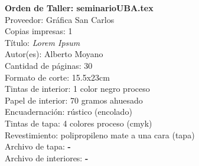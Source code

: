 \documentclass[11pt]{article}
\newcommand\titulo[1]{\sf\Large{\textbf{#1}}}
\newcommand\subtitulo[1]{\sf\large{#1}}
\begin{document}
\thispagestyle{empty}
\noindent \titulo{Orden de Taller: seminarioUBA.tex}\\

\noindent \subtitulo{Proveedor: Gráfica San Carlos}\\
\noindent \subtitulo{Copias impresas: 1}\\

\noindent \subtitulo{Título: \emph{Lorem Ipsum}}\\
\noindent \subtitulo{Autor(es): Alberto Moyano}\\
\noindent \subtitulo{Cantidad de páginas: 30}\\
\noindent \subtitulo{Formato de corte: 15.5x23cm}\\
\noindent \subtitulo{Tintas de interior: 1 color negro proceso}\\
\noindent \subtitulo{Papel de interior: 70 gramos ahuesado}\\
\noindent \subtitulo{Encuadernación: rústico (encolado)}\\
\noindent \subtitulo{Tintas de tapa: 4 colores proceso (cmyk)}\\
\noindent \subtitulo{Revestimiento: polipropileno mate a una cara (tapa)}\\
\noindent \subtitulo{Archivo de tapa: \textbf{-}}\\
\noindent \subtitulo{Archivo de interiores: \textbf{-}}\\
\end{document}
